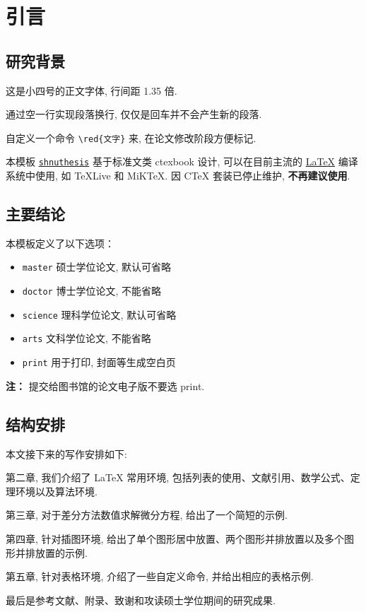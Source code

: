 

\chapter{引言}\label{chap:Intro}

\section{研究背景}\label{sec:background}

这是小四号的正文字体, 行间距 1.35 倍.

通过空一行实现段落换行, 仅仅是回车并不会产生新的段落.

自定义一个命令 \verb|\red{文字}| 来, 在论文修改阶段方便标记.

本模板 \href{https://github.com/andy123t/shnuthesis}{\texttt{shnuthesis}} 基于标准文类 ctexbook 设计, 可以在目前主流的 \href{https://en.wikibooks.org/wiki/LaTeX/Introduction}{\LaTeX{}} 编译系统中使用, 如 \TeX{}Live 和 MiK\TeX{}. 因 C\TeX{} 套装已停止维护, \textbf{不再建议使用}.


\section{主要结论}\label{sec:mainResults}

本模板定义了以下选项：
\begin{itemize}
  \item \verb|master| \quad 硕士学位论文, 默认可省略
  \item \verb|doctor| \quad 博士学位论文, 不能省略
  \item \verb|science| \quad 理科学位论文, 默认可省略
  \item \verb|arts| \quad 文科学位论文, 不能省略
  \item \verb|print| \quad 用于打印, 封面等生成空白页
\end{itemize}

\textbf{注：} 提交给图书馆的论文电子版不要选 print.


\section{结构安排}

本文接下来的写作安排如下:

第二章, 我们介绍了 LaTeX 常用环境, 包括列表的使用、文献引用、数学公式、定理环境以及算法环境.

第三章, 对于差分方法数值求解微分方程, 给出了一个简短的示例.

第四章, 针对插图环境, 给出了单个图形居中放置、两个图形并排放置以及多个图形并排放置的示例.

第五章, 针对表格环境, 介绍了一些自定义命令, 并给出相应的表格示例.

最后是参考文献、附录、致谢和攻读硕士学位期间的研究成果.

